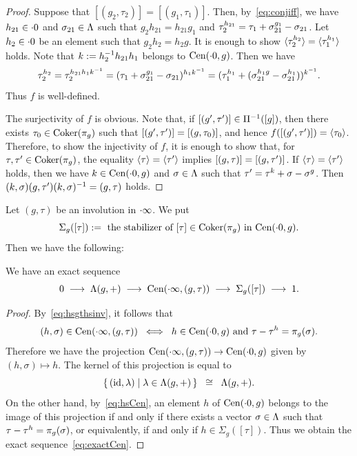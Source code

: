 \documentclass{amsart} %
\begin{document}
%
\begin{proof}
Suppose that $[(g_2, \tau_2)]=[(g_1, \tau_1)] $.
Then, by~\eqref{eq:conjiff}, we have $h_{21}\in \cdot 0$ and $\sigma_{21}\in \Lambda$ 
such that $g_2 h_{21}=h_{21} g_1$
and $\tau_2\sp{h_{21}}=\tau_1 +\sigma_{21}\sp{g_1}-\sigma_{21}$.
Let $h_2\in \cdot 0 $ be an element 
such that $g_2 h_2=h_2 g $.
It is enough to show 
$\langle {\tau_2^{ h_2}} \rangle=\langle {\tau_1^{h_1}} \rangle$ holds.
Note that $k:=h_2^{-1} h_{21} h_1$ belongs to $\mathrm{Cen}(\cdot 0, g)$.
Then we have 
\[
\tau_2^{ h_2}=\tau_2^{ h_{21} h_1 k^{-1}}
=(\tau_1 +\sigma_{21}\sp{g_1}-\sigma_{21})^{ h_1 k^{-1}}
=(\tau_1\sp{ h_1}+(\sigma_{21}\sp{h_1 g}-\sigma_{21}\sp{h_1}))^{k^{-1}}.
\]
Thus $f$ is well-defined.
\par
The surjectivity of $f$ is obvious.
Note that, if $[(g^{\prime}, \tau^{\prime})]\in \Pi^{-1}([g])$,
then there exists $\tau_0\in \operatorname{Coker}(\pi_{g})$ such that 
$[(g^{\prime}, \tau^{\prime})]=[(g, \tau_0)]$, 
and hence
$f([(g^{\prime}, \tau^{\prime})])=\langle {\tau_0} \rangle$.
Therefore, to show the injectivity of $f$,
it is enough to show that, 
for $\tau, \tau^{\prime}\in \operatorname{Coker}(\pi_{g})$,
the equality $\langle {\tau} \rangle=\langle {\tau^{\prime}} \rangle$ implies 
$[(g, \tau)]=[(g, \tau^{\prime})]$.
If $\langle {\tau} \rangle=\langle {\tau^{\prime}} \rangle$ holds,
then we have $k\in \mathrm{Cen}(\cdot 0, g)$ and $\sigma\in \Lambda$
such that $\tau^{\prime}=\tau^k+\sigma-\sigma^g$.
Then $(k, \sigma)(g, \tau^{\prime})(k, \sigma)^{-1}=(g, \tau)$ holds.
%
\end{proof}
%
%
%
Let $(g, \tau)$ be an involution in $\cdot \infty$.
We put
\[
\Sigma_g([\tau]) :=
\textrm{ the stabilizer of $[\tau]\in \operatorname{Coker}(\pi_{g})$ in $\mathrm{Cen}(\cdot 0, g)$}.
\]
Then we have the following:
%
\begin{proposition}\label{prop:exactCen}
We have an exact sequence 
%
\begin{equation}\label{eq:exactCen}
0 \;\longrightarrow\; \Lambda(g, +)\;\longrightarrow\; \mathrm{Cen}(\cdot \infty, (g, \tau)) 
\;\longrightarrow\;\Sigma_g([\tau]) \;\longrightarrow\; 1.
\end{equation}
%
\end{proposition}
%
\begin{proof}
By~\eqref{eq:hsgthsinv}, it follows that  
%
\begin{equation}\label{eq:hsCen}
(h, \sigma)\in \mathrm{Cen}(\cdot \infty, (g, \tau))
\;\; \Longleftrightarrow\;\; 
\textrm{$h\in \mathrm{Cen}(\cdot 0, g)$ and $\tau-\tau^h=\pi_{g}(\sigma)$}.
\end{equation}
%
Therefore we have the projection 
$\mathrm{Cen}(\cdot \infty, (g, \tau))\to \mathrm{Cen}(\cdot 0, g)$
given by $(h, \sigma)\mapsto h$.
The kernel of this projection is equal to 
\[
\{\,{(\mathord{\mathrm{id}}, \lambda)}\mid {\lambda\in \Lambda(g, +)} \,\}\;\;\cong\;\; \Lambda(g, +).
\]
On the other hand, by~\eqref{eq:hsCen}, 
an element $h$ of $\mathrm{Cen}(\cdot 0, g)$
belongs to the image of this projection if and only if 
there exists a vector $\sigma\in \Lambda$ such that 
$\tau-\tau^h=\pi_{g}(\sigma)$, or equivalently, if and only if 
$h\in \Sigma_g([\tau]) $.
Thus we obtain the exact sequence~\eqref{eq:exactCen}.
\end{proof}
%
%
\end{document}
